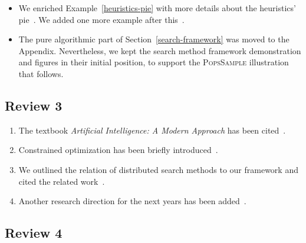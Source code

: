 \documentclass{ws-ijait}
\begin{document}
\begin{itemize}
  \item We enriched Example~\ref{heuristics-pie} with more
        details about the heuristics' pie~. We
        added one more example after this~.
  \item The pure algorithmic part of
        Section~\ref{search-framework} was moved to the
        Appendix. Nevertheless, we kept the search method
        framework demonstration and figures in their initial
        position, to support the \textsc{PopsSample}
        illustration that follows.
\end{itemize}

\subsection*{Review 3}

\begin{enumerate}
  \item The textbook \emph{Artificial Intelligence: A Modern
        Approach} has been cited~.
  \item Constrained optimization has been briefly
        introduced~.
  \item We outlined the relation of distributed search
        methods to our framework and cited the related
        work~.
  \item Another research direction for the next years has
        been added~.
\end{enumerate}

\subsection*{Review 4}
\end{document}
